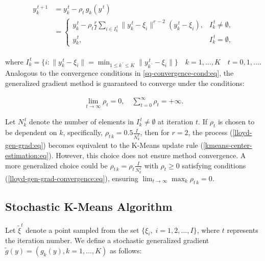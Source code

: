 \begin{eqnarray}
    \label{lloyd-gen-grad:eq}
    \begin{aligned}
        y_k^{\,t+1} &= y_k^{\,t} - \rho_t \,g_k(y^{\,t}) \\
                    &= \begin{cases}
                        y_k^{\,t} - \rho_t \frac{r}{I} \sum_{i \in I_k^{\,t}} \|y_k^{\,t} - \xi_i\|^{r\,-2}(y_k^{\,t} - \xi_i), & I_k^{\,t} \neq \emptyset, \\
                        y_k^{\,t}, & I_k^{\,t} = \emptyset,
                    \end{cases}
    \end{aligned}
\end{eqnarray}

\noindent where $I_k^{\,t} = \{i: \| y_k^{\,t} - \xi_i \| = \min_{1 \leq  k^{\,\prime} \leq K} \| y_{k^{\,\prime}}^{\,t}-\xi_i \| \} \quad k = 1 , \ldots , K \quad t = 0, 1 , \ldots$. Analogous to the convergence conditions in \ref{sq-convergence-cond:eq}, the generalized gradient method is guaranteed to converge under the conditions:

\begin{eqnarray}
    \label{lloyd-gen-grad-convergence:eq}
    \lim_{t\rightarrow\infty}\rho_t=0,\quad\sum_{t=0}^\infty\rho_t=+\infty.
\end{eqnarray}

Let $N_k^{\,t}$ denote the number of elements in $I_k^{\,t} \neq \emptyset$ at iteration $t$. If $\rho_t$ is chosen to be dependent on $k$, specifically, $\rho_{t\,k} = 0.5 \frac{I}{N_k^{\,t}}$, then for $r=2$, the process (\ref{lloyd-gen-grad:eq}) becomes equivalent to the K-Means update rule (\ref{kmeans-center-estimation:eq}). However, this choice does not ensure method convergence. A more generalized choice could be $\rho_{t\,k} = \rho_t \frac{I}{N_k^{\,t}}$ with $\rho_t \geq 0$ satisfying conditions (\ref{lloyd-gen-grad-convergence:eq}), ensuring $\lim_{t \to \infty} \max_k \rho_{t\,k} = 0$.

\subsection{Stochastic K-Means Algorithm}

Let $\tilde{\xi}^t$ denote a point sampled from the set $\{\xi_i,\;i=1,2,\ldots,I\}$, where $t$ represents the iteration number. We define a stochastic generalized gradient $\tilde{g}(y) = (g_k(y), k = 1, ..., K)$ as follows:

